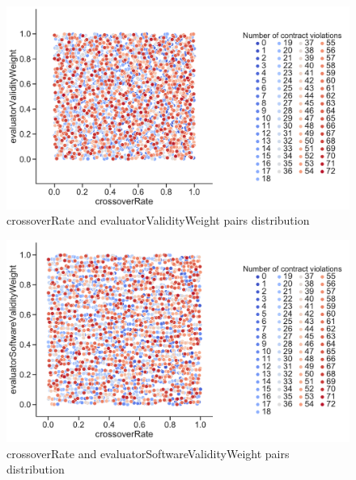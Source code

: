 \begin{figure}
	\centering
	\includegraphics[width=\textwidth]{images/PairsDistr/crossoverRate_evaluatorValidityWeight.pdf}
	\caption[crossoverRate and evaluatorValidityWeight pairs distribution]{crossoverRate and evaluatorValidityWeight pairs distribution}
	\label{fig:crossoverRate_evaluatorValidityWeight_pair}
\end{figure}
\begin{figure}
	\centering
	\includegraphics[width=\textwidth]{images/PairsDistr/crossoverRate_evaluatorSoftwareValidityWeight.pdf}
	\caption[crossoverRate and evaluatorSoftwareValidityWeight pairs distribution]{crossoverRate and evaluatorSoftwareValidityWeight pairs distribution}
	\label{fig:crossoverRate_evaluatorSoftwareValidityWeight_pair}
\end{figure}

